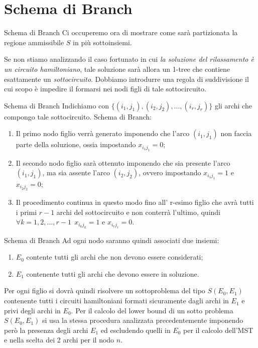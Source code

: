 \documentclass[10pt]{beamer}
\begin{document}
\section{Schema di Branch}
\begin{frame}{Schema di Branch}
    Ci occuperemo ora di mostrare come sarà partizionata la regione ammissibile $S$ in più sottoinsiemi.
    
    Se non stiamo analizzando il caso fortunato in cui \textit{la soluzione del rilassamento è un circuito hamiltoniano}, tale soluzione sarà allora un 1-tree che contiene esattamente un \textit{sottocircuito}. Dobbiamo introdurre una regola di suddivisione il cui scopo è impedire il formarsi nei nodi figli di tale sottocircuito.
\end{frame}

\begin{frame}{Schema di Branch}
    Indichiamo con $\{(i_1, j_1), (i_2,j_2),...,(i_r,j_r)\}$ gli archi che compongo tale sottocircuito.
    \newline
    \newline
    Schema di Branch:
    \begin{enumerate}[<+->]
        \item  Il primo nodo figlio verrà generato imponendo che l'arco $(i_1,j_1)$ non faccia parte della soluzione, ossia impostando $x_{i_{1}j_{1}} = 0$;
        \item Il secondo nodo figlio sarà ottenuto imponendo che sia presente l'arco $(i_1,j_1)$, ma sia assente l'arco $(i_2,j_2)$, ovvero impostando $x_{i_{1}j_{1}} = 1$ e $x_{i_{2}j_{2}} = 0$;
        \item Il procedimento continua in questo modo fino all' r-esimo figlio che avrà tutti i primi $r-1$ archi del sottocircuito e non conterrà l'ultimo, quindi $\forall k = 1,2,...,r-1 \:\:x_{i_{k}j_{k}} = 1$ e $x_{i_{r}j_{r}} = 0$.
    \end{enumerate}
     
\end{frame}

\begin{frame}{Schema di Branch}
    Ad ogni nodo saranno quindi associati due insiemi: 
    \begin{enumerate}
        \item $E_0$ contente tutti gli archi che non devono essere considerati;
        \item $E_1$ contenente tutti gli archi che devono essere in soluzione.
    \end{enumerate}
    Per ogni figlio si dovrà quindi risolvere un sottoproblema del tipo $S(E_0, E_1)$ contenente tutti i circuiti hamiltoniani formati sicuramente dagli archi in $E_1$ e privi degli archi in $E_0$.
    \newline
    \newline
    Per il calcolo del lower bound di un sotto problema $S(E_0, E_1)$ si usa la stessa procedura analizzata precedentemente imponendo però la presenza degli archi $E_1$ ed escludendo quelli in $E_0$ per il calcolo dell'MST e nella scelta dei 2 archi per il nodo $n$.
\end{frame}
\end{document}
